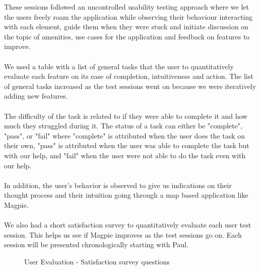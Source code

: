 These sessions followed an uncontrolled usability testing approach where we let the users freely roam the application while observing their behaviour interacting with each element, guide them when they were stuck and initiate discussion on the topic of amenities, use cases for the application and feedback on features to improve.\\\\
We used a table with a list of general tasks that the user to quantitatively evaluate each feature on its ease of completion, intuitiveness and action. The list of general tasks increased as the test sessions went on because we were iteratively adding new features.\\\\
The difficulty of the task is related to if they were able to complete it and how much they struggled during it. The status of a task can either be "complete", "pass", or "fail" where "complete" is attributed when the user does the task on their own, "pass" is attributed when the user was able to complete the task but with our help, and "fail" when the user were not able to do the task even with our help. \\\\
In addition, the user's behavior is observed to give us indications on their thought process and their intuition going through a map based application like Magpie.\\\\
We also had a short satisfaction survey to quantitatively evaluate each user test session. This helps us see if Magpie improves as the test sessions go on. Each session will be presented chronologically starting with Paul.
\begin{figure}
    \centering
    \caption{User Evaluation - Satisfaction survey questions}
\end{figure}

